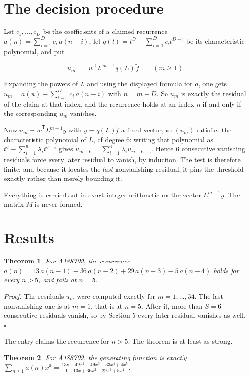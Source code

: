 \documentclass[11pt]{article}
\newtheorem{theorem}{Theorem}
\theoremstyle{definition}
\begin{document}
\section{The decision procedure}

Let $c_1,\dots,c_D$ be the coefficients of a claimed recurrence $a(n) = \sum_{i=1}^{D} c_i\,a(n-i)$, let $q(t) = t^{D} - \sum_{i=1}^{D} c_i t^{D-i}$ be its characteristic polynomial, and put

\[u_m \;=\; \tilde w^{\mathsf T} L^{\,m-1} q(L)\,\tilde f \qquad (m \ge 1).\]

Expanding the powers of $L$ and using the displayed formula for $a$, one gets $u_m = a(n) - \sum_{i=1}^{D} c_i\,a(n-i)$ with $n = m + D$. So $u_m$ is exactly the residual of the claim at that index, and the recurrence holds at an index $n$ if and only if the corresponding $u_m$ vanishes.

Now $u_m = \tilde w^{\mathsf T} L^{m-1} y$ with $y = q(L)\tilde f$ a fixed vector, so $(u_m)$ satisfies the characteristic polynomial of $L$, of degree $6$: writing that polynomial as $t^{6} - \sum_{i=1}^{6} \lambda_i t^{6-i}$ gives $u_{m+6} = \sum_{i=1}^{6} \lambda_i u_{m+6-i}$. Hence $6$ consecutive vanishing residuals force every later residual to vanish, by induction. The test is therefore finite; and because it locates the {\itshape last} nonvanishing residual, it pins the threshold exactly rather than merely bounding it.

Everything is carried out in exact integer arithmetic on the vector $L^{m-1}y$. The matrix $M$ is never formed.

\section{Results}

\begin{theorem} For A188709, the recurrence $a(n) = 13\,a(n-1) - 36\,a(n-2) + 29\,a(n-3) - 5\,a(n-4)$ holds for every $n > 5$, and fails at $n = 5$.\end{theorem}

{\itshape Proof.} The residuals $u_m$ were computed exactly for $m = 1,\dots,34$. The last nonvanishing one is at $m = 1$, that is at $n = 5$. After it, more than $S = 6$ consecutive residuals vanish, so by Section 5 every later residual vanishes as well. $\square$

The entry claims the recurrence for $n > 5$. The theorem is at least as strong.

\begin{theorem} For A188709, the generating function is exactly $\sum_{n\ge 1} a(n)x^n = \frac{13x - 49x^{2} + 49x^{3} - 33x^{4} + 4x^{5}}{1 - 13x + 36x^{2} - 29x^{3} + 5x^{4}}$.\end{theorem}
\end{document}
